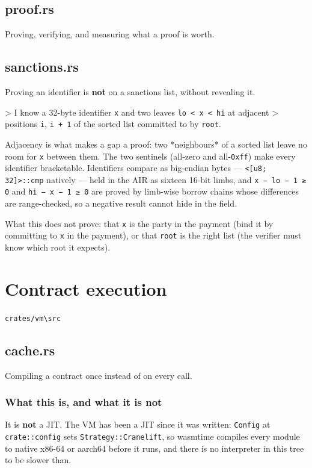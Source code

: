 \documentclass[11pt,a4paper]{article}
\begin{document}
\subsection{proof.rs}
Proving, verifying, and measuring what a proof is worth.

\subsection{sanctions.rs}
Proving an identifier is \textbf{not} on a sanctions list, without revealing it.

> I know a 32-byte identifier \texttt{x} and two leaves \texttt{lo < x < hi} at adjacent
> positions \texttt{i}, \texttt{i + 1} of the sorted list committed to by \texttt{root}.

Adjacency is what makes a gap a proof: two *neighbours* of a sorted list
leave no room for \texttt{x} between them. The two sentinels (all-zero and
all-\texttt{0xff}) make every identifier bracketable. Identifiers compare as
big-endian bytes — \texttt{<[u8; 32]>::cmp} natively — held in the AIR as sixteen
16-bit limbs, and \texttt{x − lo − 1 ≥ 0} and \texttt{hi − x − 1 ≥ 0} are proved by
limb-wise borrow chains whose differences are range-checked, so a negative
result cannot hide in the field.

What this does not prove: that \texttt{x} is the party in the payment (bind it
by committing to \texttt{x} in the payment), or that \texttt{root} is the right list
(the verifier must know which root it expects).

\section{Contract execution}
\noindent\texttt{crates/vm\textbackslash{}src}

\subsection{cache.rs}
Compiling a contract once instead of on every call.

\subsubsection{What this is, and what it is not}

It is \textbf{not} a JIT. The VM has been a JIT since it was written: \texttt{Config} at
\texttt{crate::config} sets \texttt{Strategy::Cranelift}, so wasmtime compiles every module
to native x86-64 or aarch64 before it runs, and there is no interpreter in
this tree to be slower than.
\end{document}
